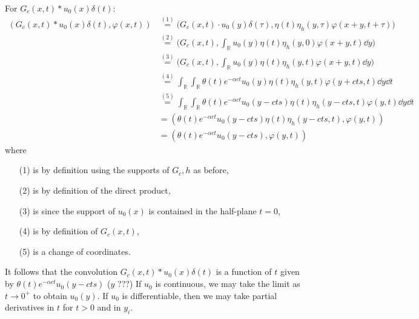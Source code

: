 \documentclass[11pt]{article}
\newcommand{\eq}[1]{\overset{(#1)}{=}}
\begin{document}
\begin{enumerate}
\begin{enumerate}[label=(\roman*)]
        For $G_c(x,t)\ast u_0(x)\delta(t)$:
        \begin{align*}
            (G_c(x,t)\ast u_0(x)\delta(t),\varphi(x,t)) &\eq{1} \big(G_c(x,t)\cdot u_0(y)\delta(\tau), \eta(t)\eta_h(y,\tau)\varphi(x+y,t+\tau)\big) \\
            &\eq{2} \bigg(G_c(x,t) , \int_{\mathbb R} u_0(y) \eta(t)\eta_h(y,0)\varphi(x+y,t)\dd y\bigg)\\
            &\eq{3} \bigg(G_c(x,t) , \int_{\mathbb R} u_0(y) \eta(t)\eta_h(y,t)\varphi(x+y,t)\dd y\bigg)\\
            &\eq{4} \int_{\mathbb R}\int_{\mathbb R} \theta(t)e^{-\alpha ct}u_0(y)\eta(t)\eta_h(y,t)\varphi(y+cts,t) \dd y\dd t \\
            &\eq{5} \int_{\mathbb R}\int_{\mathbb R} \theta(t)e^{-\alpha ct}u_0(y-cts)\eta(t)\eta_h(y-cts,t)\varphi(y,t) \dd y\dd t\\
            &= (\theta(t)e^{-\alpha ct}u_0(y-cts)\eta(t)\eta_h(y-cts,t), \varphi(y,t))\\
            &= (\theta(t)e^{-\alpha ct}u_0(y-cts), \varphi(y,t))
        \end{align*} where \begin{enumerate}
            \item[(1)] is by definition using the supports of $G_c, h$ as before,
            \item[(2)] is by definition of the direct product, 
            \item[(3)] is since the support of $u_0(x)$ is contained in the half-plane $t = 0$,
            \item[(4)] is by definition of $G_c(x,t)$,
            \item[(5)] is a change of coordinates.
        \end{enumerate} It follows that the convolution $G_c(x,t)\ast u_0(x)\delta(t)$ is a function of $t$ given by $\theta(t)e^{-\alpha ct}u_0(y-cts)$ ($y$ ???) If $u_0$ is continuous, we may take the limit as $t\to 0^+$ to obtain $u_0(y)$. If $u_0$ is differentiable, then we may take partial derivatives in $t$ for $t>0$ and in $y_i$. 


\end{enumerate}
\end{enumerate}
\end{document}
